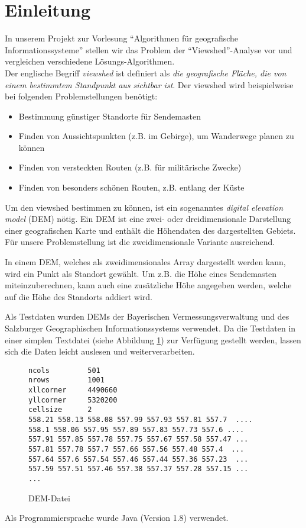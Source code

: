 \section{Einleitung}
In unserem Projekt zur Vorlesung ``Algorithmen für geografische Informationssysteme'' stellen wir das Problem der ``Viewshed''-Analyse vor und 
vergleichen verschiedene Lösungs-Algorithmen. \\ Der englische Begriff \textit{viewshed} ist definiert als \textit{die geografische Fläche, die 
von einem bestimmtem Standpunkt aus sichtbar ist}. Der viewshed wird beispielweise bei folgenden Problemstellungen benötigt:
\begin{itemize}
 \item Bestimmung günstiger Standorte für Sendemasten
 \item Finden von Aussichtspunkten (z.B. im Gebirge), um Wanderwege planen zu können
 \item Finden von versteckten Routen (z.B. für militärische Zwecke)
 \item Finden von besonders schönen Routen, z.B. entlang der Küste 
\end{itemize}
Um den viewshed bestimmen zu können, ist ein sogenanntes \textit{digital elevation model} (DEM) nötig. 
\noindent Ein DEM ist eine zwei- oder dreidimensionale Darstellung einer geografischen Karte und enthält die Höhendaten des dargestellten Gebiets. 
Für unsere Problemstellung ist die zweidimensionale Variante ausreichend.

\noindent In einem DEM, welches als zweidimensionales Array dargestellt werden kann, wird ein Punkt als Standort gewählt. Um z.B. die Höhe eines 
Sendemasten miteinzuberechnen, kann auch eine zusätzliche Höhe angegeben werden, welche auf die Höhe des Standorts addiert wird.

\noindent Als Testdaten wurden DEMs der Bayerischen Vermessungsverwaltung \cite{berchtesgaden} und des Salzburger Geographischen Informationssystems 
\cite{salzburg} verwendet. Da die Testdaten in einer simplen Textdatei (siehe Abbildung \ref{testfile}) zur Verfügung gestellt werden, lassen sich die Daten leicht 
auslesen und weiterverarbeiten.

\begin{figure}[!ht]
 \centering
 \begin{BVerbatim}
ncols         501
nrows         1001
xllcorner     4490660
yllcorner     5320200
cellsize      2
558.21 558.13 558.08 557.99 557.93 557.81 557.7  ....
558.1 558.06 557.95 557.89 557.83 557.73 557.6 ....
557.91 557.85 557.78 557.75 557.67 557.58 557.47 ...
557.81 557.78 557.7 557.66 557.56 557.48 557.4  ...
557.64 557.6 557.54 557.46 557.44 557.36 557.23  ...
557.59 557.51 557.46 557.38 557.37 557.28 557.15 ...
...
\end{BVerbatim}
\caption{DEM-Datei}
\label{testfile}
\end{figure}

\noindent Als Programmiersprache wurde Java (Version 1.8) verwendet. 

